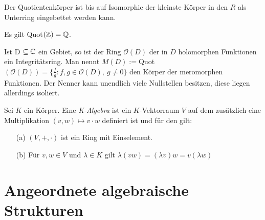 %
%
% 
%
%
\begin{bem}
Der Quotientenkörper ist bis auf Isomorphie der kleinste Körper in den $R$ als Unterring eingebettet werden kann.
\end{bem}
%
%
%
%
\begin{bsp}
Es gilt Quot$(\mathbb{Z}) = \mathbb{Q}$.

\end{bsp}
%
%
%
\begin{bsp}
Ist D $\subseteq \mathbb{C}$ ein Gebiet, so ist der Ring $ \mathcal{O} (D) $ der in $D$ holomorphen Funktionen ein Integritätsring. Man nennt
$ M \left(D\right) := $Quot$\left( \mathcal{O} \left( D \right)\right) = \lbrace \frac{f}{g}: f,g \in \mathcal{O} (D), ~g \neq 0\rbrace$ den Körper der meromorphen Funktionen. Der Nenner kann unendlich viele Nullstellen besitzen, diese liegen allerdings isoliert. 
\end{bsp}
%
%
%
%
%
%
\begin{defn} %
Sei $K$ ein Körper. Eine \textit{K-Algebra} ist ein $K$-Vektorraum $V$ auf dem zusätzlich eine Multiplikation $\left(v,w\right) \mapsto v\cdot w$ definiert ist und für den gilt:
\begin{itemize}
\item[(a)] $\left(V, +, \cdot\right)$ ist ein Ring mit Einselement.
\item[(b)] Für $v,w \in V$ und $\lambda \in K$ gilt $\lambda\left(vw\right) = \left(\lambda v\right)w = v\left(\lambda w\right)$
\end{itemize}
\end{defn}
%
%
\section{Angeordnete algebraische Strukturen}
